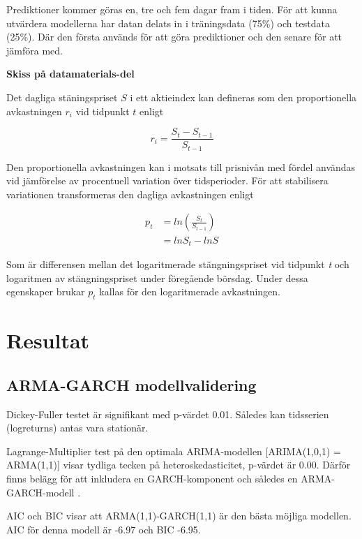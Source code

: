 \documentclass[12pt]{article}
\begin{document}
Prediktioner kommer göras en, tre och fem dagar fram i tiden. För att kunna utvärdera modellerna har datan delats in i träningsdata (75\%) och testdata (25\%). Där den första används för att göra prediktioner och den senare för att jämföra med. \par


\newpage

\textbf{Skiss på datamaterials-del} \par
Det dagliga stäningspriset $S$ i ett aktieindex kan defineras som den proportionella avkastningen $r_{i}$ vid tidpunkt $t$ enligt

\begin{equation*}
    r_{i} = \frac{S_{t} - S_{t-1}}{S_{t-1}}
\end{equation*}

Den proportionella avkastningen kan i motsats till prisnivån med fördel användas vid jämförelse av procentuell variation över tidsperioder. För att stabilisera variationen transformeras den dagliga avkastningen enligt

\begin{equation*} \label{eq1}
\begin{split}
p_{t} & = ln(\frac{S_{t}}{S_{t-1}}) \\
 & = lnS_{t} - lnS_{}
\end{split}
\end{equation*}

Som är differensen mellan det logaritmerade stängningspriset vid tidpunkt \emph{t} och logaritmen av stängningspriset under föregående börsdag. Under dessa egenskaper brukar $p_{t}$ kallas för den logaritmerade avkastningen.



\newpage
\section{Resultat}
\subsection{ARMA-GARCH modellvalidering}
Dickey-Fuller testet är signifikant med p-värdet 0.01. Således kan tidsserien (logreturns) antas vara stationär. \par 
Lagrange-Multiplier test på den optimala ARIMA-modellen [ARIMA(1,0,1) = ARMA(1,1)] visar tydliga tecken på heteroskedasticitet, p-värdet är 0.00. Därför finns belägg för att inkludera en GARCH-komponent och således en ARMA-GARCH-modell . \par 
AIC och BIC visar att ARMA(1,1)-GARCH(1,1) är den bästa möjliga modellen. AIC för denna modell är -6.97 och BIC -6.95.
\end{document}
